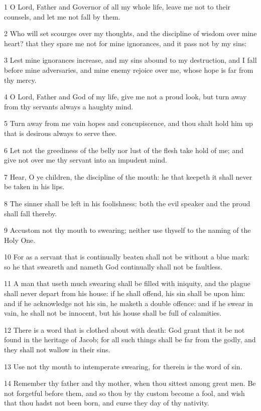 \par 1 O Lord, Father and Governor of all my whole life, leave me not to their counsels, and let me not fall by them.
\par 2 Who will set scourges over my thoughts, and the discipline of wisdom over mine heart? that they spare me not for mine ignorances, and it pass not by my sins:
\par 3 Lest mine ignorances increase, and my sins abound to my destruction, and I fall before mine adversaries, and mine enemy rejoice over me, whose hope is far from thy mercy.
\par 4 O Lord, Father and God of my life, give me not a proud look, but turn away from thy servants always a haughty mind.
\par 5 Turn away from me vain hopes and concupiscence, and thou shalt hold him up that is desirous always to serve thee.
\par 6 Let not the greediness of the belly nor lust of the flesh take hold of me; and give not over me thy servant into an impudent mind.
\par 7 Hear, O ye children, the discipline of the mouth: he that keepeth it shall never be taken in his lips.
\par 8 The sinner shall be left in his foolishness: both the evil speaker and the proud shall fall thereby.
\par 9 Accustom not thy mouth to swearing; neither use thyself to the naming of the Holy One.
\par 10 For as a servant that is continually beaten shall not be without a blue mark: so he that sweareth and nameth God continually shall not be faultless.
\par 11 A man that useth much swearing shall be filled with iniquity, and the plague shall never depart from his house: if he shall offend, his sin shall be upon him: and if he acknowledge not his sin, he maketh a double offence: and if he swear in vain, he shall not be innocent, but his house shall be full of calamities.
\par 12 There is a word that is clothed about with death: God grant that it be not found in the heritage of Jacob; for all such things shall be far from the godly, and they shall not wallow in their sins.
\par 13 Use not thy mouth to intemperate swearing, for therein is the word of sin.
\par 14 Remember thy father and thy mother, when thou sittest among great men. Be not forgetful before them, and so thou by thy custom become a fool, and wish that thou hadst not been born, and curse they day of thy nativity.
